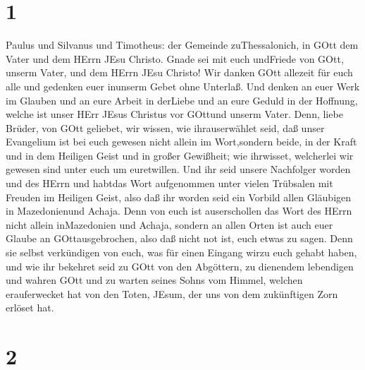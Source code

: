 \hypertarget{section}{%
\section{1}\label{section}}

 Paulus und Silvanus und Timotheus: der Gemeinde
zuThessalonich, in GOtt dem Vater und dem HErrn JEsu Christo. Gnade sei
mit euch undFriede von GOtt, unserm Vater, und dem HErrn JEsu Christo!
 Wir danken GOtt allezeit für euch alle und gedenken euer
inunserm Gebet ohne Unterlaß.  Und denken an euer Werk im
Glauben und an eure Arbeit in derLiebe und an eure Geduld in der
Hoffnung, welche ist unser HErr JEsus Christus vor GOttund unserm Vater.
 Denn, liebe Brüder, von GOtt geliebet, wir wissen, wie
ihrauserwählet seid,  daß unser Evangelium ist bei euch
gewesen nicht allein im Wort,sondern beide, in der Kraft und in dem
Heiligen Geist und in großer Gewißheit; wie ihrwisset, welcherlei wir
gewesen sind unter euch um euretwillen.  Und ihr seid unsere
Nachfolger worden und des HErrn und habtdas Wort aufgenommen unter
vielen Trübsalen mit Freuden im Heiligen Geist,  also daß
ihr worden seid ein Vorbild allen Gläubigen in Mazedonienund Achaja.
 Denn von euch ist auserschollen das Wort des HErrn nicht
allein inMazedonien und Achaja, sondern an allen Orten ist auch euer
Glaube an GOttausgebrochen, also daß nicht not ist, euch etwas zu sagen.
 Denn sie selbst verkündigen von euch, was für einen Eingang
wirzu euch gehabt haben, und wie ihr bekehret seid zu GOtt von den
Abgöttern, zu dienendem lebendigen und wahren GOtt  und zu
warten seines Sohns vom Himmel, welchen erauferwecket hat von den Toten,
JEsum, der uns von dem zukünftigen Zorn erlöset hat.

\hypertarget{section-1}{%
\section{2}\label{section-1}}

